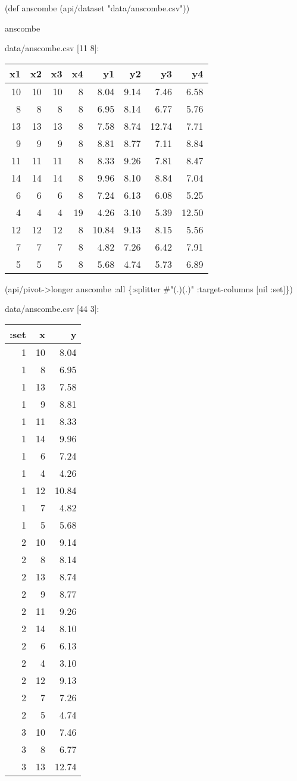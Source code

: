 \documentclass[]{article}
\newenvironment{Shaded}{\begin{snugshade}}{\end{snugshade}}
\newcommand{\StringTok}[1]{\textcolor[rgb]{0.31,0.60,0.02}{#1}}
\newcommand{\SpecialStringTok}[1]{\textcolor[rgb]{0.31,0.60,0.02}{#1}}
\newcommand{\FunctionTok}[1]{\textcolor[rgb]{0.00,0.00,0.00}{#1}}
\newcommand{\VariableTok}[1]{\textcolor[rgb]{0.00,0.00,0.00}{#1}}
\newcommand{\BuiltInTok}[1]{#1}
\newcommand{\AttributeTok}[1]{\textcolor[rgb]{0.77,0.63,0.00}{#1}}
\newcommand{\NormalTok}[1]{#1}
\begin{document}
\begin{Shaded}
\begin{Highlighting}[]
\NormalTok{(}\BuiltInTok{def}\FunctionTok{ anscombe }\NormalTok{(api/dataset }\StringTok{"data/anscombe.csv"}\NormalTok{))}
\end{Highlighting}
\end{Shaded}

\begin{Shaded}
\begin{Highlighting}[]
\NormalTok{anscombe}
\end{Highlighting}
\end{Shaded}

data/anscombe.csv {[}11 8{]}:

\begin{longtable}[]{@{}rrrrrrrr@{}}
\toprule
x1 & x2 & x3 & x4 & y1 & y2 & y3 & y4\tabularnewline
\midrule
\endhead
10 & 10 & 10 & 8 & 8.04 & 9.14 & 7.46 & 6.58\tabularnewline
8 & 8 & 8 & 8 & 6.95 & 8.14 & 6.77 & 5.76\tabularnewline
13 & 13 & 13 & 8 & 7.58 & 8.74 & 12.74 & 7.71\tabularnewline
9 & 9 & 9 & 8 & 8.81 & 8.77 & 7.11 & 8.84\tabularnewline
11 & 11 & 11 & 8 & 8.33 & 9.26 & 7.81 & 8.47\tabularnewline
14 & 14 & 14 & 8 & 9.96 & 8.10 & 8.84 & 7.04\tabularnewline
6 & 6 & 6 & 8 & 7.24 & 6.13 & 6.08 & 5.25\tabularnewline
4 & 4 & 4 & 19 & 4.26 & 3.10 & 5.39 & 12.50\tabularnewline
12 & 12 & 12 & 8 & 10.84 & 9.13 & 8.15 & 5.56\tabularnewline
7 & 7 & 7 & 8 & 4.82 & 7.26 & 6.42 & 7.91\tabularnewline
5 & 5 & 5 & 8 & 5.68 & 4.74 & 5.73 & 6.89\tabularnewline
\bottomrule
\end{longtable}

\begin{Shaded}
\begin{Highlighting}[]
\NormalTok{(api/pivot->longer anscombe }\AttributeTok{:all}\NormalTok{ \{}\AttributeTok{:splitter} \SpecialStringTok{#"(.)(.)"}
                                  \AttributeTok{:target-columns}\NormalTok{ [}\VariableTok{nil} \AttributeTok{:set}\NormalTok{]\})}
\end{Highlighting}
\end{Shaded}

data/anscombe.csv {[}44 3{]}:

\begin{longtable}[]{@{}rrr@{}}
\toprule
:set & x & y\tabularnewline
\midrule
\endhead
1 & 10 & 8.04\tabularnewline
1 & 8 & 6.95\tabularnewline
1 & 13 & 7.58\tabularnewline
1 & 9 & 8.81\tabularnewline
1 & 11 & 8.33\tabularnewline
1 & 14 & 9.96\tabularnewline
1 & 6 & 7.24\tabularnewline
1 & 4 & 4.26\tabularnewline
1 & 12 & 10.84\tabularnewline
1 & 7 & 4.82\tabularnewline
1 & 5 & 5.68\tabularnewline
2 & 10 & 9.14\tabularnewline
2 & 8 & 8.14\tabularnewline
2 & 13 & 8.74\tabularnewline
2 & 9 & 8.77\tabularnewline
2 & 11 & 9.26\tabularnewline
2 & 14 & 8.10\tabularnewline
2 & 6 & 6.13\tabularnewline
2 & 4 & 3.10\tabularnewline
2 & 12 & 9.13\tabularnewline
2 & 7 & 7.26\tabularnewline
2 & 5 & 4.74\tabularnewline
3 & 10 & 7.46\tabularnewline
3 & 8 & 6.77\tabularnewline
3 & 13 & 12.74\tabularnewline
\bottomrule
\end{longtable}
\end{document}
